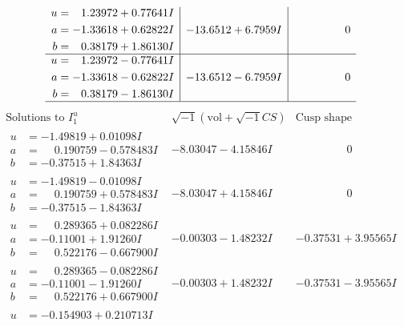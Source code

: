 \documentclass[1p]{elsarticle_modified}
\theoremstyle{definition}
\newcommand{\I}{\sqrt{-1}}
\begin{document}
$$\begin{array}{c|c|c}
\begin{aligned}
u &= \phantom{-}1.23972 + 0.77641 I \\
a &= -1.33618 + 0.62822 I \\
b &= \phantom{-}0.38179 + 1.86130 I\end{aligned}
 & -13.6512 + 6.7959 I & \phantom{-0.000000 } 0 \\ \hline\begin{aligned}
u &= \phantom{-}1.23972 - 0.77641 I \\
a &= -1.33618 - 0.62822 I \\
b &= \phantom{-}0.38179 - 1.86130 I\end{aligned}
 & -13.6512 - 6.7959 I & \phantom{-0.000000 } 0\\
 \hline 
 \end{array}$$\newpage$$\begin{array}{c|c|c}  
\text{Solutions to }I^u_{1}& \I (\text{vol} + \sqrt{-1}CS) & \text{Cusp shape}\\
 \hline 
\begin{aligned}
u &= -1.49819 + 0.01098 I \\
a &= \phantom{-}0.190759 - 0.578483 I \\
b &= -0.37515 + 1.84363 I\end{aligned}
 & -8.03047 - 4.15846 I & \phantom{-0.000000 } 0 \\ \hline\begin{aligned}
u &= -1.49819 - 0.01098 I \\
a &= \phantom{-}0.190759 + 0.578483 I \\
b &= -0.37515 - 1.84363 I\end{aligned}
 & -8.03047 + 4.15846 I & \phantom{-0.000000 } 0 \\ \hline\begin{aligned}
u &= \phantom{-}0.289365 + 0.082286 I \\
a &= -0.11001 + 1.91260 I \\
b &= \phantom{-}0.522176 - 0.667900 I\end{aligned}
 & -0.00303 - 1.48232 I & -0.37531 + 3.95565 I \\ \hline\begin{aligned}
u &= \phantom{-}0.289365 - 0.082286 I \\
a &= -0.11001 - 1.91260 I \\
b &= \phantom{-}0.522176 + 0.667900 I\end{aligned}
 & -0.00303 + 1.48232 I & -0.37531 - 3.95565 I \\ \hline\begin{aligned}
u &= -0.154903 + 0.210713 I \\

\end{aligned}
\end{array}$$
\end{document}
